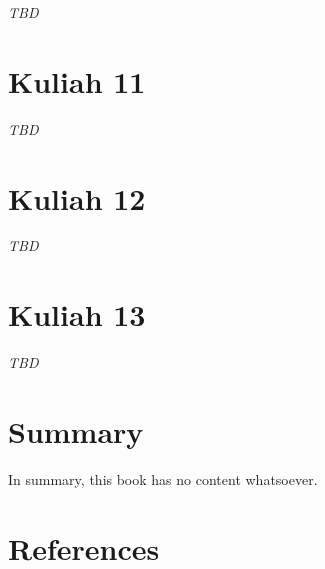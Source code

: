 \documentclass[
  letterpaper,
  DIV=11,
  numbers=noendperiod]{scrreprt}
\begin{document}
\emph{TBD}


\chapter{Kuliah 11}\label{kuliah-11}

\emph{TBD}


\chapter{Kuliah 12}\label{kuliah-12}

\emph{TBD}


\chapter{Kuliah 13}\label{kuliah-13}

\emph{TBD}


\chapter{Summary}\label{summary}

In summary, this book has no content whatsoever.


\chapter*{References}\label{references}


\label{refs}
\end{document}
